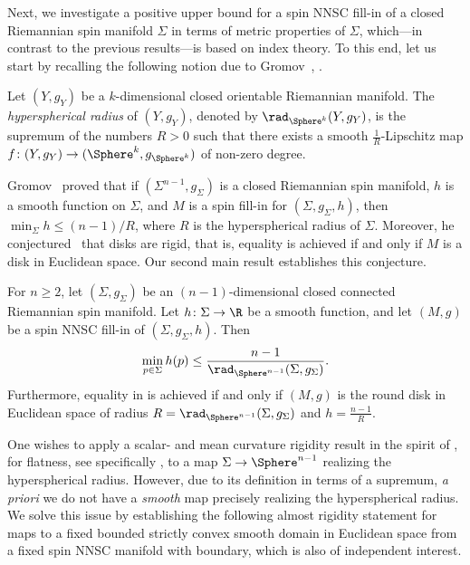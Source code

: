 \documentclass[a4paper,11pt]{amsart}
\numberwithin{equation}{section}
\begin{document}
Next, we investigate a positive upper bound for a spin NNSC fill-in of a closed Riemannian spin manifold $\Sigma$ in terms of metric properties of $\Sigma$, which---in contrast to the previous results---is based on index theory.
To this end, let us start by recalling the following notion due to Gromov~\cite[Section~1]{gromov2019scalar},  \cite[Section 4.3]{Gromov_four_lectures}.

\begin{definition}\label{Def:hyperspherical radius}
    Let $(Y,g_Y)$ be a $k$-dimensional closed orientable Riemannian manifold. The \emph{hyperspherical radius} of $(Y,g_Y)$, denoted by $\rad_{\Sphere^k}(Y,g_Y)$, is the supremum of the numbers $R>0$ such that there exists a smooth $\tfrac1R$-Lipschitz map $f\colon (Y,g_Y)\to (\Sphere^k,g_{\Sphere^k})$ of non-zero degree.
\end{definition}

Gromov~\cite[Section 2]{gromov2019scalar} proved that if $(\Sigma^{n-1}, g_{\Sigma})$ is a closed Riemannian spin manifold, $h$ is a smooth function on $\Sigma$, and $M$ is a spin fill-in for $(\Sigma,g_\Sigma,h)$, then $\min_{\Sigma} h \leq (n-1)/R$, where $R$ is the hyperspherical radius of $\Sigma$.
Moreover, he conjectured~\cite[Page~3]{gromov2019scalar} that disks are rigid, that is, equality is achieved if and only if $M$ is a disk in Euclidean space.
Our second main result establishes this conjecture.

\begin{theorem}\label{Thm:Gromov rigidity}
For $n\geq2$, let $(\Sigma,g_\Sigma)$ be an $(n-1)$-dimensional closed connected Riemannian spin manifold.
Let $h\colon \Sigma\to\R$ be a smooth function, and let $(M,g)$ be a spin NNSC fill-in of $(\Sigma,g_\Sigma,h)$.
Then
\begin{equation}\label{eq:spherical_radius}
    \min_{p\in\Sigma} h(p)\leq\frac{n-1}{\rad_{\Sphere^{n-1}}(\Sigma,g_\Sigma)}.
\end{equation}
Furthermore, equality in  is achieved if and only if $(M,g)$ is the round disk in Euclidean space of radius \(R = \rad_{\Sphere^{n-1}}(\Sigma,g_\Sigma)\) and $h=\frac{n-1}{R}$.
\end{theorem}
One wishes to apply a scalar- and mean curvature rigidity result in the spirit of \textcite{GoetteSemmelmann,Lott}, for flatness, see specifically \textcite[Theorem 3.2]{wang2023gromovs}, to a map \(\Sigma \to \Sphere^{n-1}\) realizing the hyperspherical radius.
However, due to its definition in terms of a supremum, \emph{a priori} we do not have a \emph{smooth} map precisely realizing the hyperspherical radius.
We solve this issue by establishing the following almost rigidity statement for maps to a fixed bounded strictly convex smooth domain in Euclidean space from a fixed spin NNSC manifold with boundary, which is also of independent interest.
\end{document}
